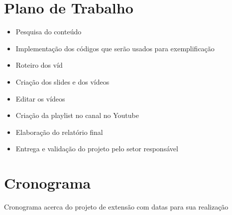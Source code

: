 \documentclass[a4paper,10pt]{article} %
\begin{document}


\section{Plano de Trabalho}

 \begin{itemize}
  \item Pesquisa do conteúdo 
  \item Implementação dos códigos que serão usados para exemplificação
  \item Roteiro dos víd
  \item Criação dos slides e dos vídeos
  \item Editar os vídeos
  \item Criação da playlist no canal no Youtube
  \item Elaboração do relatório final
  \item Entrega e validação do projeto pelo setor responsável
\end{itemize}

\section{Cronograma}
Cronograma acerca do projeto de extensão com datas para sua realização 
\end{document}
